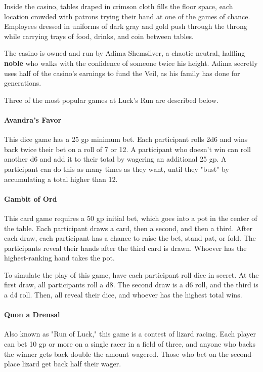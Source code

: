 \documentclass[a4paper, 11pt, bg=full, twocolumn, nooutline]{dndbook}
\begin{document}
Inside the casino, tables draped in crimson cloth fills the floor space, each location crowded with patrons trying their hand at one of the games of chance. Employees dressed in uniforms of dark gray and gold push through the throng while carrying trays of food, drinks, and coin between tables.

The casino is owned and run by Adima Shemsilver, a chaotic neutral, halfling \textbf{noble} who walks with the confidence of someone twice his height. Adima secretly uses half of the casino's earnings to fund the Veil, as his family has done for generations.

Three of the most popular games at Luck's Run are described below.

\paragraph{Avandra's Favor}

This dice game has a 25 gp minimum bet. Each participant rolls 2d6 and wins back twice their bet on a roll of 7 or 12. A participant who doesn't win can roll another d6 and add it to their total by wagering an additional 25 gp. A participant can do this as many times as they want, until they "bust" by accumulating a total higher than 12.

\paragraph{Gambit of Ord}

This card game requires a 50 gp initial bet, which goes into a pot in the center of the table. Each participant draws a card, then a second, and then a third. After each draw, each participant has a chance to raise the bet, stand pat, or fold. The participants reveal their hands after the third card is drawn. Whoever has the highest-ranking hand takes the pot.

To simulate the play of this game, have each participant roll dice in secret. At the first draw, all participants roll a d8. The second draw is a d6 roll, and the third is a d4 roll. Then, all reveal their dice, and whoever has the highest total wins.

\paragraph{Quon a Drensal}

Also known as "Run of Luck," this game is a contest of lizard racing. Each player can bet 10 gp or more on a single racer in a field of three, and anyone who backs the winner gets back double the amount wagered. Those who bet on the second-place lizard get back half their wager.
\end{document}
